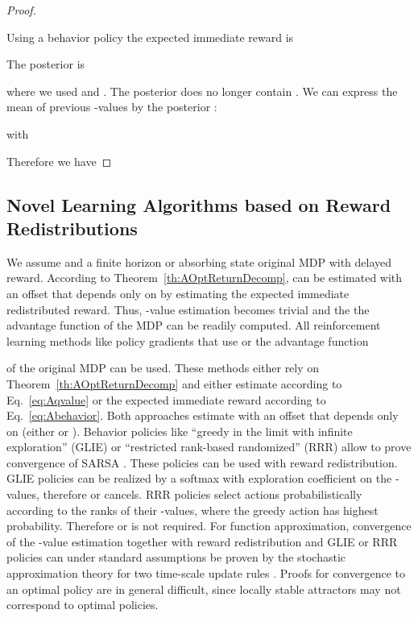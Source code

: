 \documentclass{article}
\begin{document}
\begin{appendices}
\begin{proof}
~~\newline

Using a behavior policy 
 the expected immediate reward is
 
The posterior   is
 
where we used  and  .
The posterior does no longer contain .
We can express the mean of previous -values
by the posterior  :
 
with 
 
Therefore we have



\end{proof}




\subsection{Novel Learning Algorithms based on Reward Redistributions}
\label{sec:Alearning}
We assume  and a finite horizon or absorbing state
original MDP  with delayed reward.
According to Theorem~\ref{th:AOptReturnDecomp}, 
 can be estimated with an offset that 
depends only on  
by estimating the expected immediate redistributed reward.
Thus, -value estimation becomes trivial and the
the advantage function of the MDP  can be readily computed.
All reinforcement learning methods like policy gradients that use 
 or 
the advantage function 

of the original MDP 
can be used. These methods either rely on Theorem~\ref{th:AOptReturnDecomp}
and either estimate  according to Eq.~\eqref{eq:Aqvalue} 
or the expected immediate reward 
according to Eq.~\eqref{eq:Abehavior}. 
Both approaches estimate 
 with an offset 
that depends only on  (either  
or ).
Behavior policies like
``greedy in the limit with infinite exploration'' (GLIE) or
``restricted rank-based randomized'' (RRR) allow to prove
convergence of SARSA \cite{Singh:00}.
These policies can be used with reward redistribution.
GLIE policies can be realized by a softmax with exploration coefficient 
on the -values, 
therefore  or  cancels.
RRR policies select actions probabilistically according to 
the ranks of their -values, where the 
greedy action has highest probability. Therefore 
or 
is not required.
For function approximation, 
convergence of the -value estimation together 
with reward redistribution and GLIE or RRR policies 
can under standard assumptions be proven by the stochastic 
approximation theory for 
two time-scale update rules \cite{Borkar:97,Karmakar:17}.
Proofs for convergence to an optimal policy are in general 
difficult, since locally stable attractors 
may not correspond to optimal policies.



\end{appendices}
\end{document}
